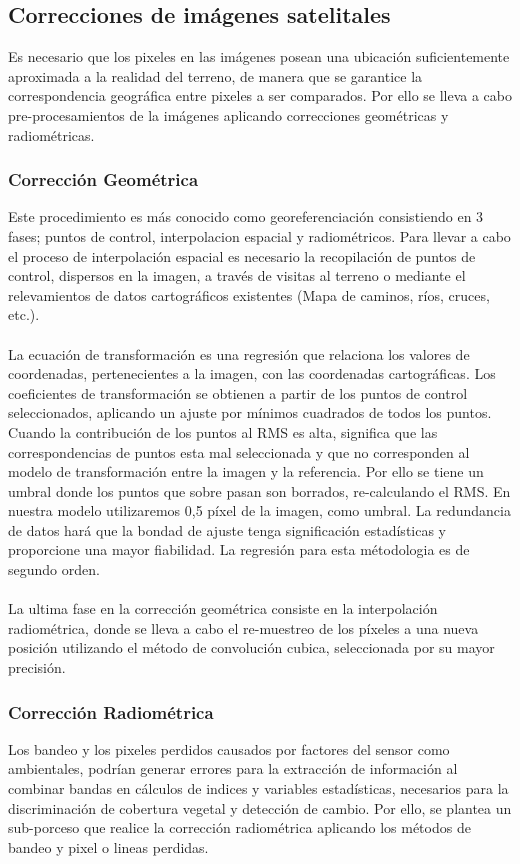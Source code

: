 \subsection{Correcciones de im\'agenes satelitales}\label{sec:coorImsat}
Es necesario que los pixeles en las im\'agenes posean una ubicaci\'on suficientemente aproximada a la realidad del terreno, de manera que se garantice la correspondencia geogr\'afica entre pixeles a ser comparados. Por ello se lleva a cabo pre-procesamientos de la im\'agenes aplicando correcciones geom\'etricas y radiom\'etricas.
\subsubsection{Correcci\'on Geom\'etrica}
Este procedimiento es m\'as conocido como georeferenciaci\'on consistiendo en 3 fases; puntos de control, interpolacion espacial y radiom\'etricos. Para llevar a cabo el proceso de interpolaci\'on espacial es necesario la recopilaci\'on de puntos de control, dispersos en la imagen, a trav\'es de visitas al terreno o mediante el relevamientos de datos cartogr\'aficos existentes (Mapa de caminos, ríos, cruces, etc.).\\~\\
La ecuaci\'on de transformaci\'on es una regresi\'on que relaciona los valores de coordenadas, pertenecientes a la imagen, con las coordenadas cartogr\'aficas. Los coeficientes de transformaci\'on se obtienen a partir de los puntos de control seleccionados, aplicando un ajuste por m\'inimos cuadrados de todos los puntos. Cuando la contribuci\'on de los puntos al RMS es alta, significa que las correspondencias de puntos esta mal seleccionada y que no corresponden al modelo de transformaci\'on entre la imagen y la referencia. Por ello se tiene un umbral donde los puntos que sobre pasan son borrados, re-calculando el RMS. En nuestra modelo utilizaremos 0,5 p\'ixel de la imagen, como umbral. La redundancia de datos har\'a que la bondad de ajuste tenga significaci\'on estad\'isticas y proporcione una mayor fiabilidad. La regresi\'on para esta m\'etodologia es de segundo orden.\\~\\
La ultima fase en la correcci\'on geom\'etrica consiste en la interpolaci\'on radiom\'etrica, donde se lleva a cabo el re-muestreo de los p\'ixeles a una nueva posici\'on utilizando el m\'etodo de convoluci\'on cubica, seleccionada por su mayor precisi\'on.
\subsubsection{Correcci\'on Radiom\'etrica}
Los bandeo y los pixeles perdidos causados por factores del sensor como ambientales, podr\'ian generar errores para la extracci\'on de informaci\'on al combinar bandas en c\'alculos de indices y variables estad\'isticas, necesarios para la discriminaci\'on de cobertura vegetal y detecci\'on de cambio. Por ello, se plantea un sub-porceso que realice la correcci\'on radiom\'etrica aplicando los m\'etodos de bandeo y pixel o lineas perdidas.

